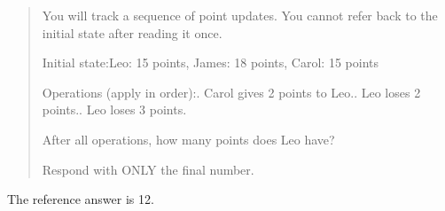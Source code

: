 \begin{quote}\small
You will track a sequence of point updates. You cannot refer back to the initial state after reading it once.

Initial state:\newline Leo: 15 points, James: 18 points, Carol: 15 points

Operations (apply in order):. Carol gives 2 points to Leo.. Leo loses 2 points.. Leo loses 3 points.

After all operations, how many points does Leo have?

Respond with ONLY the final number.
\end{quote}
The reference answer is 12.
